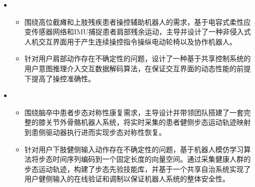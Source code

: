   \begin{itemize}[leftmargin=*]
    \item {}
    {\small
      \begin{itemize}
        \item 围绕高位截瘫和上肢残疾患者操控辅助机器人的需求，基于电容式柔性应变传感器网络和IMU捕捉患者肩部残余运动，主导并设计了一种非侵入式人机交互界面用于产生连续操控指令操纵电动轮椅以及协作机器人。
        \item 针对用户肩部动作存在不确定性的问题，设计了一种基于共享控制系统的用户意图推理介入交互数据解码算法，在保证交互界面的动态性能的前提下提高了操控准确性。
      \end{itemize}
    }

    \item {}
    {\small
    \begin{itemize}
      \item 围绕脑卒中患者步态对称性康复需求，主导设计并带领团队搭建了一套完整的膝关节外骨骼机器人系统，将实时采集的患者健侧步态运动轨迹映射到患侧驱动器执行进而实现步态对称性恢复。
      \item 针对用户下肢健侧输入动作存在不确定性的问题，基于机器人模仿学习算法将步态时间序列编码到一个固定长度的向量空间。通过采集健康人群的步态运动轨迹，构建了步态先验技能库，并基于一个共享自治系统实现了用户健侧输入的在线验证和调制以保证机器人系统的整体安全性。
    \end{itemize}
    }


\end{itemize}

